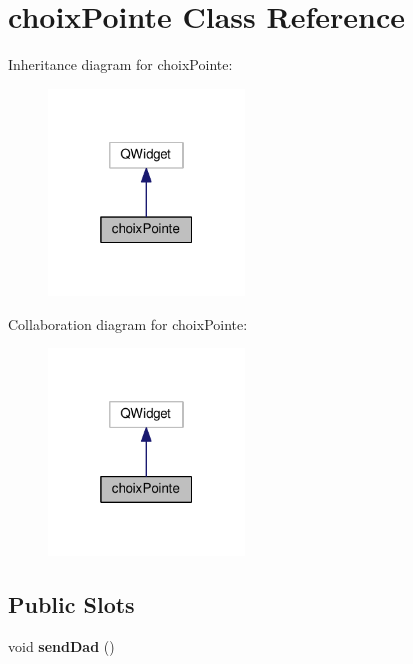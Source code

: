 \hypertarget{classchoix_pointe}{\section{choix\-Pointe Class Reference}
\label{classchoix_pointe}
}


Inheritance diagram for choix\-Pointe\-:
\nopagebreak
\begin{figure}[H]
\begin{center}
\leavevmode
\includegraphics[width=148pt]{classchoix_pointe__inherit__graph}
\end{center}
\end{figure}


Collaboration diagram for choix\-Pointe\-:
\nopagebreak
\begin{figure}[H]
\begin{center}
\leavevmode
\includegraphics[width=148pt]{classchoix_pointe__coll__graph}
\end{center}
\end{figure}
\subsection*{Public Slots}
\begin{DoxyCompactItemize}
\item 
\hypertarget{classchoix_pointe_ac8ccad58270933a4950d5c6e2cc74168}{void {\bfseries send\-Dad} ()}\label{classchoix_pointe_ac8ccad58270933a4950d5c6e2cc74168}

\end{DoxyCompactItemize}
